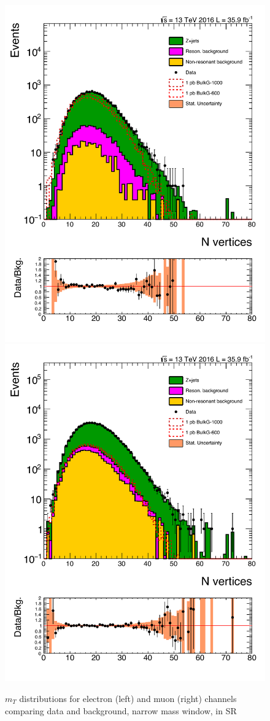 \begin{figure}[htbp!]
\centering
\includegraphics[width=0.46\linewidth,page=5]{figures/ReMiniSummer16_DT_PhReMiniMCRcFixXsec_GMCPhPtWt_SRdPhiGT0p5_puWeightsummer16_muoneg_gjet_metfilter_unblind_el_log_1pb.pdf}
\includegraphics[width=0.46\linewidth,page=5]{figures/ReMiniSummer16_DT_PhReMiniMCRcFixXsec_GMCPhPtWt_SRdPhiGT0p5_puWeightsummer16_muoneg_gjet_metfilter_unblind_mu_log_1pb.pdf}
\caption{$m_T$ distributions for electron (left) and muon (right) channels
comparing data and background,
narrow mass window, in SR}
\label{fig:SR_gjet_mt_narrow}
\end{figure}

